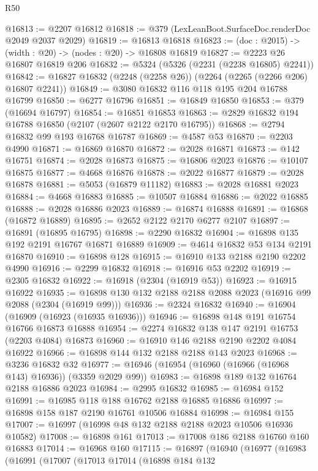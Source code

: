 \begin{lexlean}{R50}
\begin{coremodule}
@16813 := @2207 @16812
@16818 := @379 (LexLeanBoot.SurfaceDoc.renderDoc @2049 @2037 @2029)
@16819 := @16813 @16818
@16823 := (doc : @2015) -> (width : @20) -> (nodes : @20) -> @16808 @16819
@16827 := @2223 @26 @16807 @16819 @206
@16832 := @5324 (@5326 (@2231 (@2238 @16805) @2241))
@16842 := @16827 @16832 (@2248 (@2258 @26)) (@2264 (@2265 (@2266 @206) @16807 @2241))
@16849 := @3080 @16832 @116 @118 @195 @204 @16788 @16799
@16850 := @6277 @16796
@16851 := @16849 @16850
@16853 := @379 (@16694 @16797)
@16854 := @16851 @16853
@16863 := @2829 @16832 @194 @16788 @16850 (@2107 (@2607 @2122 @2170 @16795))
@16868 := @2794 @16832 @99 @193 @16768 @16787
@16869 := @4587 @53
@16870 := @2203 @4990
@16871 := @16869 @16870
@16872 := @2028 @16871
@16873 := @142 @16751
@16874 := @2028 @16873
@16875 := @16806 @2023
@16876 := @10107 @16875
@16877 := @4668 @16876
@16878 := @2022 @16877
@16879 := @2028 @16878
@16881 := @5053 (@16879 @11182)
@16883 := @2028 @16881 @2023
@16884 := @4668 @16883
@16885 := @10507 @16884
@16886 := @2022 @16885
@16888 := @2028 @16886 @2023
@16889 := @16874 @16888
@16891 := @16868 (@16872 @16889)
@16895 := @2652 @2122 @2170 @6277 @2107
@16897 := @16891 (@16895 @16795)
@16898 := @2290 @16832
@16904 := @16898 @135 @192 @2191 @16767 @16871 @16889
@16909 := @4614 @16832 @53 @134 @2191 @16870
@16910 := @16898 @128
@16915 := @16910 @133 @2188 @2190 @2202 @4990
@16916 := @2299 @16832
@16918 := @16916 @53 @2202
@16919 := @2305 @16832
@16922 := @16918 (@2304 (@16919 @53))
@16923 := @16915 @16922
@16935 := @16898 @130 @132 @2188 @2188 @2088 @2023 (@16916 @99 @2088 (@2304 (@16919 @99)))
@16936 := @2324 @16832
@16940 := @16904 (@16909 (@16923 (@16935 @16936)))
@16946 := @16898 @148 @191 @16754 @16766 @16873 @16888
@16954 := @2274 @16832 @138 @147 @2191 @16753 (@2203 @4084) @16873
@16960 := @16910 @146 @2188 @2190 @2202 @4084 @16922
@16966 := @16898 @144 @132 @2188 @2188 @143 @2023
@16968 := @3236 @16832 @32
@16977 := @16946 (@16954 (@16960 (@16966 (@16968 @143) @16936)) (@3359 @2029 @99))
@16983 := @16898 @189 @132 @16764 @2188 @16886 @2023
@16984 := @2995 @16832
@16985 := @16984 @152
@16991 := @16985 @118 @188 @16762 @2188 @16885 @16886
@16997 := @16898 @158 @187 @2190 @16761 @10506 @16884
@16998 := @16984 @155
@17007 := @16997 (@16998 @48 @132 @2188 @2188 @2023 @10506 @16936 @10582)
@17008 := @16898 @161
@17013 := @17008 @186 @2188 @16760 @160 @16883
@17014 := @16968 @160
@17115 := @16897
    (@16940
      (@16977
        (@16983
          (@16991
            (@17007
              (@17013
                @17014
                (@16898
                  @184
                  @132

\end{coremodule}
\end{lexlean}
